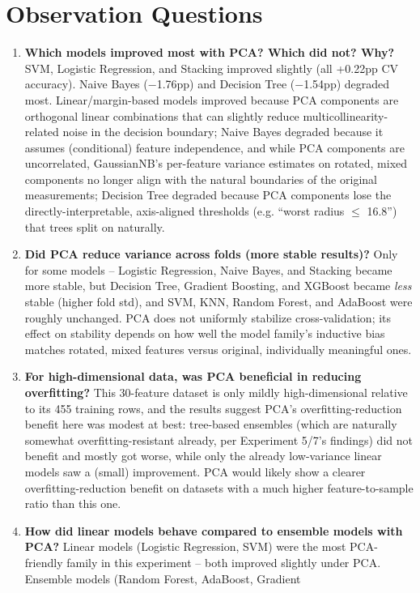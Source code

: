 \documentclass[12pt,a4paper]{article}
\begin{document}
\section{Observation Questions}
\begin{enumerate}
\item \textbf{Which models improved most with PCA? Which did not? Why?} SVM, Logistic
Regression, and Stacking improved slightly (all +0.22pp CV accuracy). Naive Bayes ($-$1.76pp)
and Decision Tree ($-$1.54pp) degraded most. Linear/margin-based models improved because PCA
components are orthogonal linear combinations that can slightly reduce multicollinearity-related
noise in the decision boundary; Naive Bayes degraded because it assumes (conditional)
feature independence, and while PCA components are uncorrelated, GaussianNB's per-feature
variance estimates on rotated, mixed components no longer align with the natural boundaries of
the original measurements; Decision Tree degraded because PCA components lose the
directly-interpretable, axis-aligned thresholds (e.g. ``worst radius $\le$ 16.8'') that trees
split on naturally.
\item \textbf{Did PCA reduce variance across folds (more stable results)?} Only for some
models -- Logistic Regression, Naive Bayes, and Stacking became more stable, but Decision
Tree, Gradient Boosting, and XGBoost became \emph{less} stable (higher fold std), and SVM,
KNN, Random Forest, and AdaBoost were roughly unchanged. PCA does not uniformly stabilize
cross-validation; its effect on stability depends on how well the model family's inductive
bias matches rotated, mixed features versus original, individually meaningful ones.
\item \textbf{For high-dimensional data, was PCA beneficial in reducing overfitting?} This
30-feature dataset is only mildly high-dimensional relative to its 455 training rows, and the
results suggest PCA's overfitting-reduction benefit here was modest at best: tree-based
ensembles (which are naturally somewhat overfitting-resistant already, per Experiment 5/7's
findings) did not benefit and mostly got worse, while only the already low-variance linear
models saw a (small) improvement. PCA would likely show a clearer overfitting-reduction
benefit on datasets with a much higher feature-to-sample ratio than this one.
\item \textbf{How did linear models behave compared to ensemble models with PCA?} Linear
models (Logistic Regression, SVM) were the most PCA-friendly family in this experiment --
both improved slightly under PCA. Ensemble models (Random Forest, AdaBoost, Gradient

\end{enumerate}
\end{document}
